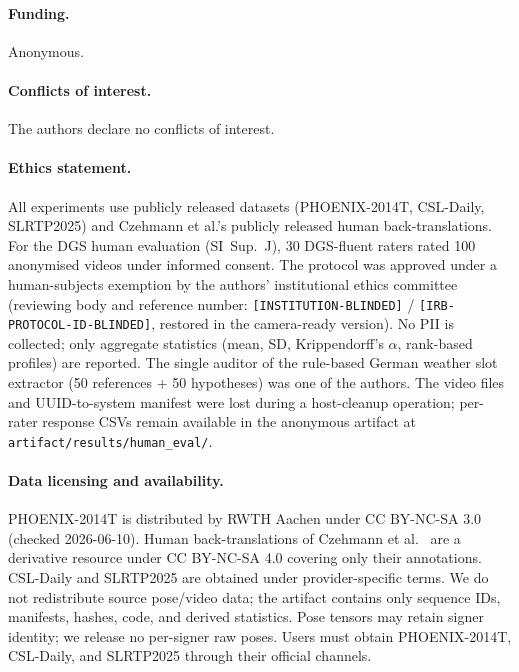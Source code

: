 \documentclass[pdflatex,sn-chicago]{sn-jnl}
\begin{document}
\paragraph{Funding.} Anonymous.

\paragraph{Conflicts of interest.} The authors declare no conflicts of interest.

\paragraph{Ethics statement.}
All experiments use publicly released datasets (PHOENIX-2014T, CSL-Daily, SLRTP2025) and Czehmann et al.'s publicly released human back-translations. For the DGS human evaluation (SI~Sup.~J), 30 DGS-fluent raters rated 100 anonymised videos under informed consent. The protocol was approved under a human-subjects exemption by the authors' institutional ethics committee (reviewing body and reference number: \texttt{[INSTITUTION-BLINDED]} / \texttt{[IRB-PROTOCOL-ID-BLINDED]}, restored in the camera-ready version). No PII is collected; only aggregate statistics (mean, SD, Krippendorff's $\alpha$, rank-based profiles) are reported. The single auditor of the rule-based German weather slot extractor (50 references + 50 hypotheses) was one of the authors. The video files and UUID-to-system manifest were lost during a host-cleanup operation; per-rater response CSVs remain available in the anonymous artifact at \texttt{artifact/results/human\_eval/}.

\paragraph{Data licensing and availability.} PHOENIX-2014T is distributed by RWTH Aachen under CC BY-NC-SA 3.0 (checked 2026-06-10). Human back-translations of Czehmann et al.~\cite{czehmann2026sacred} are a derivative resource under CC BY-NC-SA 4.0 covering only their annotations. CSL-Daily and SLRTP2025 are obtained under provider-specific terms. We do not redistribute source pose/video data; the artifact contains only sequence IDs, manifests, hashes, code, and derived statistics. Pose tensors may retain signer identity; we release no per-signer raw poses. Users must obtain PHOENIX-2014T, CSL-Daily, and SLRTP2025 through their official channels.
\end{document}

